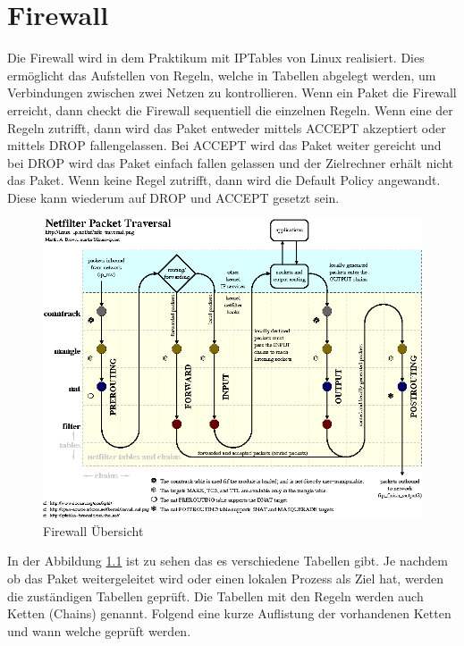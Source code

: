 \chapter{Firewall}
Die Firewall wird in dem Praktikum mit IPTables von Linux realisiert. Dies ermöglicht das Aufstellen von Regeln, welche in Tabellen abgelegt werden, um Verbindungen zwischen zwei Netzen zu kontrollieren. Wenn ein Paket die Firewall erreicht, dann checkt die Firewall sequentiell die einzelnen Regeln. Wenn eine der Regeln zutrifft, dann wird das Paket entweder mittels ACCEPT akzeptiert oder mittels DROP fallengelassen. Bei ACCEPT wird das Paket weiter gereicht und bei DROP wird das Paket einfach fallen gelassen und der Zielrechner erhält nicht das Paket. Wenn keine Regel zutrifft, dann wird die Default Policy angewandt. Diese kann wiederum auf DROP und ACCEPT gesetzt sein. 
\begin{figure}
	\centering
		\includegraphics[width=1.00\textwidth]{figures/firewall_uebersicht.PNG}
	\caption{Firewall Übersicht \cite{linux-ip}}
	\label{fig:firewall_uebersicht}
\end{figure}
In der Abbildung \ref{fig:firewall_uebersicht} ist zu sehen das es verschiedene Tabellen gibt. Je nachdem ob das Paket weitergeleitet wird oder einen lokalen Prozess als Ziel hat, werden die zuständigen Tabellen geprüft. Die Tabellen mit den Regeln werden auch Ketten (Chains) genannt. Folgend eine kurze Auflistung der vorhandenen Ketten und wann welche geprüft werden.
